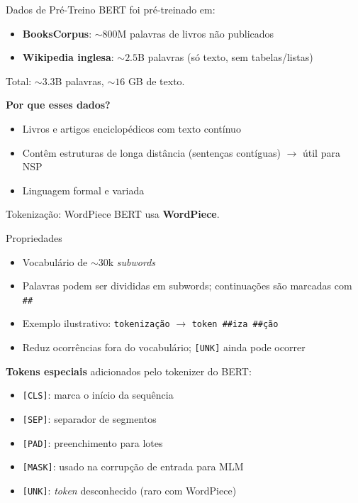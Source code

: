 \documentclass[aspectratio=169, xcolor=dvipsnames]{beamer}
\begin{document}
  \begin{frame}{Dados de Pré-Treino}
        BERT foi pré-treinado em:
        \begin{itemize}
          \item \textbf{BooksCorpus}: $\sim 800$M palavras de livros não publicados
          \item \textbf{Wikipedia inglesa}: $\sim 2.5$B palavras (só texto, sem tabelas/listas)
        \end{itemize}
        \vspace{0.3em}
        Total: $\sim 3.3$B palavras, $\sim 16$ GB de texto.
        \vspace{0.4em}

        \textbf{Por que esses dados?}
        \begin{itemize}
          \item Livros e artigos enciclopédicos com texto contínuo
          \item Contêm estruturas de longa distância (sentenças contíguas) $\to$ útil para NSP
          \item Linguagem formal e variada
        \end{itemize}

  \end{frame}

  \begin{frame}{Tokenização: WordPiece}
    BERT usa \textbf{WordPiece}.
    \begin{block}{Propriedades}
      \begin{itemize}
        \item Vocabulário de $\sim 30$k \textit{subwords}
        \item Palavras podem ser divididas em subwords; continuações são marcadas com \texttt{\#\#}
        \item Exemplo ilustrativo: \texttt{tokenização} $\to$ \texttt{token \#\#iza \#\#ção}
        \item Reduz ocorrências fora do vocabulário; \texttt{[UNK]} ainda pode ocorrer
      \end{itemize}
    \end{block}
    \vspace{0.3em}
    \textbf{Tokens especiais} adicionados pelo tokenizer do BERT:
    \begin{itemize}
      \item \texttt{[CLS]}: marca o início da sequência
      \item \texttt{[SEP]}: separador de segmentos
      \item \texttt{[PAD]}: preenchimento para lotes
      \item \texttt{[MASK]}: usado na corrupção de entrada para MLM
      \item \texttt{[UNK]}: \textit{token} desconhecido (raro com WordPiece)
    \end{itemize}
  \end{frame}
\end{document}
